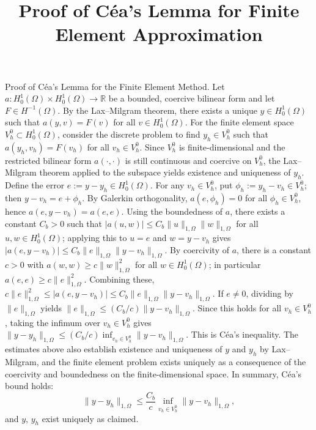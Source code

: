 \documentclass[11pt]{article}
\begin{document}
\title{Proof of Céa's Lemma for Finite Element Approximation}
\maketitle

Proof of Céa's Lemma for the Finite Element Method. Let $a: H^1_0(\Omega) \times H^1_0(\Omega) \to \mathbb{R}$ be a bounded, coercive bilinear form and let $F \in H^{-1}(\Omega)$. By the Lax--Milgram theorem, there exists a unique $y \in H^1_0(\Omega)$ such that $a(y,v) = F(v)$ for all $v \in H^1_0(\Omega)$. For the finite element space $V_h^0 \subset H^1_0(\Omega)$, consider the discrete problem to find $y_h \in V_h^0$ such that $a(y_h,v_h) = F(v_h)$ for all $v_h \in V_h^0$. Since $V_h^0$ is finite-dimensional and the restricted bilinear form $a(\cdot,\cdot)$ is still continuous and coercive on $V_h^0$, the Lax--Milgram theorem applied to the subspace yields existence and uniqueness of $y_h$. Define the error $e := y - y_h \in H^1_0(\Omega)$. For any $v_h \in V_h^0$, put $\phi_h := y_h - v_h \in V_h^0$; then $y - v_h = e + \phi_h$. By Galerkin orthogonality, $a(e, \phi_h) = 0$ for all $\phi_h \in V_h^0$, hence $a(e, y - v_h) = a(e, e)$. Using the boundedness of $a$, there exists a constant $C_b > 0$ such that $|a(u,w)| \le C_b \|u\|_{1,\Omega} \|w\|_{1,\Omega}$ for all $u,w \in H^1_0(\Omega)$; applying this to $u = e$ and $w = y - v_h$ gives $|a(e, y - v_h)| \le C_b \|e\|_{1,\Omega} \|y - v_h\|_{1,\Omega}$. By coercivity of $a$, there is a constant $c > 0$ with $a(w,w) \ge c \|w\|_{1,\Omega}^2$ for all $w \in H^1_0(\Omega)$; in particular $a(e,e) \ge c \|e\|_{1,\Omega}^2$. Combining these, $c \|e\|_{1,\Omega}^2 \le |a(e, y - v_h)| \le C_b \|e\|_{1,\Omega} \|y - v_h\|_{1,\Omega}$. If $e \ne 0$, dividing by $\|e\|_{1,\Omega}$ yields $\|e\|_{1,\Omega} \le (C_b/c) \|y - v_h\|_{1,\Omega}$. Since this holds for all $v_h \in V_h^0$, taking the infimum over $v_h \in V_h^0$ gives $\|y - y_h\|_{1,\Omega} \le (C_b/c) \inf_{v_h \in V_h^0} \|y - v_h\|_{1,\Omega}$. This is Céa’s inequality. The estimates above also establish existence and uniqueness of $y$ and $y_h$ by Lax--Milgram, and the finite element problem exists uniquely as a consequence of the coercivity and boundedness on the finite-dimensional space. In summary, Céa’s bound holds:
\[
\|y - y_h\|_{1,\Omega} \le \frac{C_b}{c}\inf_{v_h \in V_h^0} \|y - v_h\|_{1,\Omega},
\]
and $y$, $y_h$ exist uniquely as claimed.
\end{document}
